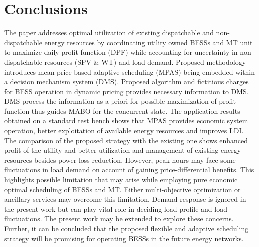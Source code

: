 \documentclass[journal]{IEEEtran}
\begin{document}
    \section{Conclusions}
    \label{section:conclusions}
    The paper addresses optimal utilization of existing dispatchable and non-dispatchable energy resources by coordinating utility owned BESSs and MT unit to maximize daily profit function (DPF) while accounting for uncertainty in non-dispatchable resources (SPV \& WT) and load demand. Proposed methodology introduces mean price-based adaptive scheduling (MPAS) being embedded within a decision mechanism system (DMS). Proposed algorithm and fictitious charges for BESS operation in dynamic pricing provides necessary information to DMS. DMS process the information as a priori for possible maximization of profit function thus guides MABO for the concurrent state. The application results obtained on a standard test bench shows that MPAS provides economic system operation, better exploitation of available energy resources and improves LDI. The comparison of the proposed strategy with the existing one shows enhanced profit of the utility and better utilization and management of existing energy resources besides power loss reduction. However, peak hours may face some fluctuations in load demand on account of gaining price-differential benefits. This highlights possible limitation that may arise while employing pure economic optimal scheduling of BESSs and MT. Either multi-objective optimization or ancillary services may overcome this limitation. Demand response is ignored in the present work but can play vital role in deciding load profile and load fluctuations. The present work may be extended to explore these concerns. Further, it can be concluded that the proposed flexible and adaptive scheduling strategy will be promising for operating BESSs in the future energy networks.
%
	\balance 
	
	
\end{document}
